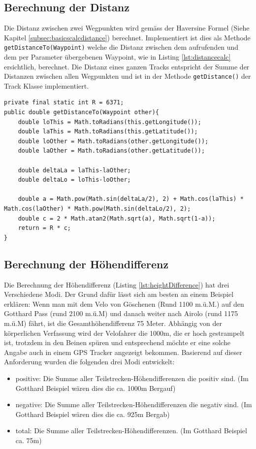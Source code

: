 \subsection{Berechnung der Distanz}
\label{subsec:distance}
Die Distanz zwischen zwei Wegpunkten wird gemäss der Haversine Formel (Siehe Kapitel \ref{subsec:basicscalcdistance}) berechnet. Implementiert ist dies als Methode \lstinline$getDistanceTo(Waypoint)$ welche die Distanz zwischen dem aufrufenden und dem per Parameter übergebenen Waypoint, wie in Listing \ref{lst:distancecalc} ersichtlich, berechnet. Die Distanz eines ganzen Tracks entspricht der Summe der Distanzen zwischen allen Wegpunkten und ist in der Methode \lstinline$getDistance()$ der Track Klasse implementiert.

\begin{lstlisting}[caption={Distanzberechnung}, label={lst:distancecalc}]
private final static int R = 6371;
public double getDistanceTo(Waypoint other){
	double loThis = Math.toRadians(this.getLongitude());
	double laThis = Math.toRadians(this.getLatitude());
	double loOther = Math.toRadians(other.getLongitude());
	double laOther = Math.toRadians(other.getLatitude());
	
	double deltaLa = laThis-laOther;
	double deltaLo = loThis-loOther;
	
	double a = Math.pow(Math.sin(deltaLa/2), 2) + Math.cos(laThis) * Math.cos(laOther) * Math.pow(Math.sin(deltaLo/2), 2);
	double c = 2 * Math.atan2(Math.sqrt(a), Math.sqrt(1-a));
	return = R * c;
}
\end{lstlisting}

\subsection{Berechnung der Höhendifferenz}
\label{subsec:heightdifference}
Die Berechnung der Höhendifferenz (Listing \ref{lst:heightDifference}) hat drei Verschiedene Modi. Der Grund dafür lässt sich am besten an einem Beispiel erklären: Wenn man mit dem Velo von Göschenen (Rund 1100 m.ü.M.) auf den Gotthard Pass (rund 2100 m.ü.M) und danach weiter nach Airolo (rund 1175 m.ü.M) fährt, ist die Gesamthöhendifferenz 75 Meter. Abhängig von der körperlichen Verfassung wird der Velofahrer die 1000m, die er hoch gestrampelt ist, trotzdem in den Beinen spüren und entsprechend möchte er eine solche Angabe auch in einem GPS Tracker angezeigt bekommen. Basierend auf dieser Anforderung wurden die folgenden drei Modi entwickelt:

\begin{itemize}
\item positive: Die Summe aller Teilstrecken-Höhendifferenzen die positiv sind. (Im Gotthard Beispiel wären dies die ca. 1000m Bergauf)
\item negative: Die Summe aller Teilstrecken-Höhendifferenzen die negativ sind. (Im Gotthard Beispiel wären dies die ca. 925m Bergab)
\item total: Die Summe aller Teilstrecken-Höhendifferenzen. (Im Gotthard Beispiel ca. 75m)
\end{itemize}

